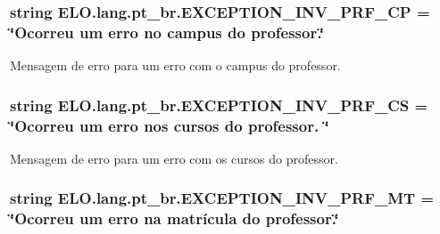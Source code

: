 \hypertarget{namespaceELO_1_1lang_1_1pt__br_af69f20acf736c63a8eeddb4c69f7a1d0}{
\subsubsection[{E\-X\-C\-E\-P\-T\-I\-O\-N\-\_\-\-I\-N\-V\-\_\-\-P\-R\-F\-\_\-\-C\-P}]{\setlength{\rightskip}{0pt plus 5cm}string E\-L\-O.\-lang.\-pt\-\_\-br.\-E\-X\-C\-E\-P\-T\-I\-O\-N\-\_\-\-I\-N\-V\-\_\-\-P\-R\-F\-\_\-\-C\-P = \char`\"{}Ocorreu um erro no campus do professor.\char`\"{}}}\label{d5/d70/namespaceELO_1_1lang_1_1pt__br_af69f20acf736c63a8eeddb4c69f7a1d0}


Mensagem de erro para um erro com o campus do professor. 

\hypertarget{namespaceELO_1_1lang_1_1pt__br_af8c2a3e201aee7c3d26f14cd0b049b6f}{
\subsubsection[{E\-X\-C\-E\-P\-T\-I\-O\-N\-\_\-\-I\-N\-V\-\_\-\-P\-R\-F\-\_\-\-C\-S}]{\setlength{\rightskip}{0pt plus 5cm}string E\-L\-O.\-lang.\-pt\-\_\-br.\-E\-X\-C\-E\-P\-T\-I\-O\-N\-\_\-\-I\-N\-V\-\_\-\-P\-R\-F\-\_\-\-C\-S = \char`\"{}Ocorreu um erro nos cursos do professor. \char`\"{}}}\label{d5/d70/namespaceELO_1_1lang_1_1pt__br_af8c2a3e201aee7c3d26f14cd0b049b6f}


Mensagem de erro para um erro com os cursos do professor. 

\hypertarget{namespaceELO_1_1lang_1_1pt__br_ad235382693cbb6a1e0e43f7d27482780}{
\subsubsection[{E\-X\-C\-E\-P\-T\-I\-O\-N\-\_\-\-I\-N\-V\-\_\-\-P\-R\-F\-\_\-\-M\-T}]{\setlength{\rightskip}{0pt plus 5cm}string E\-L\-O.\-lang.\-pt\-\_\-br.\-E\-X\-C\-E\-P\-T\-I\-O\-N\-\_\-\-I\-N\-V\-\_\-\-P\-R\-F\-\_\-\-M\-T = \char`\"{}Ocorreu um erro na matrícula do professor.\char`\"{}}}\label{d5/d70/namespaceELO_1_1lang_1_1pt__br_ad235382693cbb6a1e0e43f7d27482780}


